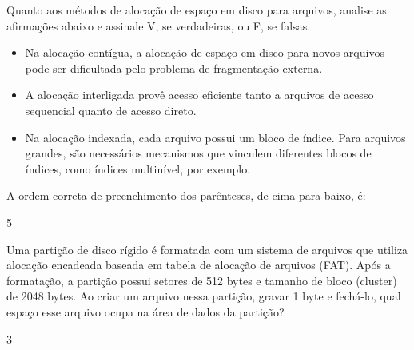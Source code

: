 %
%
%
{
\def\AMCbeginQuestion#1#2{\par\noindent{\bf (POSCOMP 2018 - Questão 34)}}
\begin{question}{} Quanto aos métodos de alocação de espaço em disco para arquivos, analise as afirmações abaixo e assinale V, se verdadeiras, ou F, se falsas.
	
\begin{itemize}[label={( )}, leftmargin=1.5cm]
\item Na alocação contígua, a alocação de espaço em disco para novos arquivos pode ser dificultada pelo problema de fragmentação externa.
\item A alocação interligada provê acesso eficiente tanto a arquivos de acesso sequencial quanto de acesso direto.
\item Na alocação indexada, cada arquivo possui um bloco de índice. Para arquivos grandes, são necessários mecanismos que vinculem diferentes blocos de índices, como índices multinível, por exemplo.
\end{itemize}

A ordem correta de preenchimento dos parênteses, de cima para baixo, é:
\begin{multicols}{5}\columnseprule=0.1pt
\begin{choices}
\end{choices}
\end{multicols}
\end{question}
}
%
{
\def\AMCbeginQuestion#1#2{\par\noindent{\bf (POSCOMP 2017 - Questão 46)}}
\begin{question}{} Uma partição de disco rígido é formatada com um sistema de arquivos que utiliza
alocação encadeada baseada em tabela de alocação de arquivos (FAT). Após a formatação, a partição
possui setores de 512 bytes e tamanho de bloco (cluster) de 2048 bytes. Ao criar um arquivo nessa
partição, gravar 1 byte e fechá-lo, qual espaço esse arquivo ocupa na área de dados da partição?
	
\begin{multicols}{3}\columnseprule=0.1pt
\begin{choices}
\end{choices}
\end{multicols}
\end{question}
}
